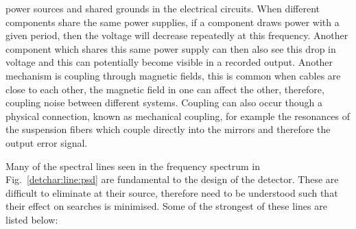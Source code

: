power sources and shared grounds in the electrical circuits.  When different components share the same power supplies, if
a component draws power with a given period, then the voltage will decrease
repeatedly at this frequency.  Another component which shares this same power
supply can then also see this drop in voltage and this can potentially become
visible in a recorded output.  Another mechanism is coupling through magnetic
fields, this is common when cables are close to each other, the magnetic field
in one can affect the other, therefore, coupling noise between different
systems.  Coupling can also occur though a physical connection, known as
mechanical coupling, for example the resonances of the suspension fibers which
couple directly into the mirrors and therefore the output error signal.

%

Many of the spectral lines seen in the frequency spectrum in
Fig.~\ref{detchar:line:psd} are fundamental to the design of the detector.
These are difficult to eliminate at their source, therefore need to be understood such that their
effect on searches is minimised.  Some of the strongest of these lines are
listed below:

